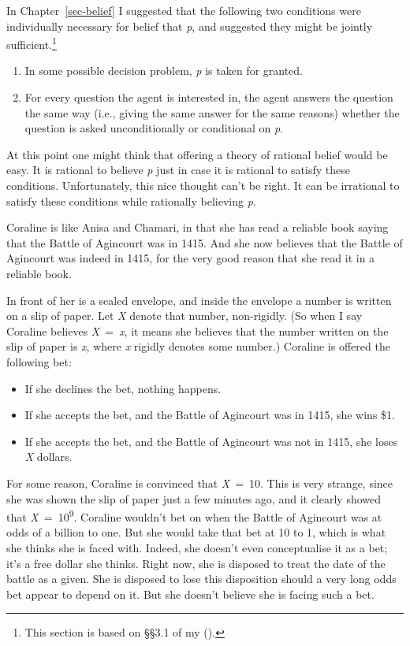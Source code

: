 \documentclass[
  12pt,
  letterpaper,
]{scrbook}
\providecommand{\tightlist}{%
  \setlength{\itemsep}{0pt}\setlength{\parskip}{0pt}}\usepackage{longtable,booktabs,array}
\begin{document}
In Chapter~\ref{sec-belief} I suggested that the following two
conditions were individually necessary for belief that \emph{p}, and
suggested they might be jointly sufficient.\footnote{This section is
  based on §§3.1 of my ().}

\begin{enumerate}
\def\labelenumi{\arabic{enumi}.}
\tightlist
\item
  In some possible decision problem, \emph{p} is taken for granted.
\item
  For every question the agent is interested in, the agent answers the
  question the same way (i.e., giving the same answer for the same
  reasons) whether the question is asked unconditionally or conditional
  on \emph{p}.
\end{enumerate}

At this point one might think that offering a theory of rational belief
would be easy. It is rational to believe \emph{p} just in case it is
rational to satisfy these conditions. Unfortunately, this nice thought
can't be right. It can be irrational to satisfy these conditions while
rationally believing \emph{p}.

Coraline is like Anisa and Chamari, in that she has read a reliable book
saying that the Battle of Agincourt was in 1415. And she now believes
that the Battle of Agincourt was indeed in 1415, for the very good
reason that she read it in a reliable book.

In front of her is a sealed envelope, and inside the envelope a number
is written on a slip of paper. Let \emph{X} denote that number,
non-rigidly. (So when I say Coraline believes \emph{X}~=~\emph{x}, it
means she believes that the number written on the slip of paper is
\emph{x}, where \emph{x} rigidly denotes some number.) Coraline is
offered the following bet:

\begin{itemize}
\tightlist
\item
  If she declines the bet, nothing happens.
\item
  If she accepts the bet, and the Battle of Agincourt was in 1415, she
  wins \$1.
\item
  If she accepts the bet, and the Battle of Agincourt was not in 1415,
  she loses \emph{X} dollars.
\end{itemize}

For some reason, Coraline is convinced that \emph{X}~=~10. This is very
strange, since she was shown the slip of paper just a few minutes ago,
and it clearly showed that \emph{X}~=~10\textsuperscript{9}. Coraline
wouldn't bet on when the Battle of Agincourt was at odds of a billion to
one. But she would take that bet at 10 to 1, which is what she thinks
she is faced with. Indeed, she doesn't even conceptualise it as a bet;
it's a free dollar she thinks. Right now, she is disposed to treat the
date of the battle as a given. She is disposed to lose this disposition
should a very long odds bet appear to depend on it. But she doesn't
believe she is facing such a bet.
\end{document}
